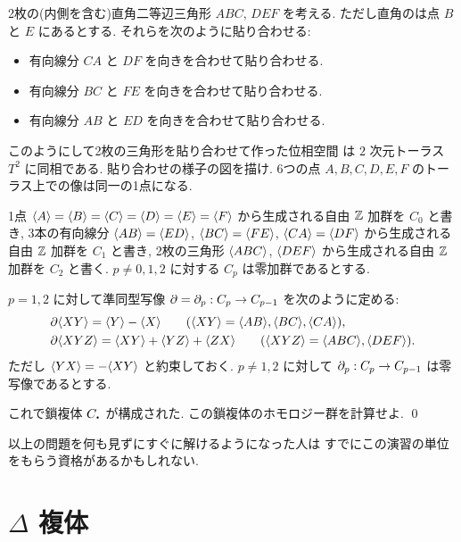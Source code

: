\documentclass[12pt,twoside]{jarticle}
\begin{document}
\begin{question}
\label{q:T^2-Delta}
  2枚の(内側を含む)直角二等辺三角形 $ABC$, $DEF$ を考える.
  ただし直角のは点 $B$ と $E$ にあるとする.
  それらを次のように貼り合わせる:
  \begin{itemize}
  \item 有向線分 $CA$ と $DF$ を向きを合わせて貼り合わせる. 
  \item 有向線分 $BC$ と $FE$ を向きを合わせて貼り合わせる. 
  \item 有向線分 $AB$ と $ED$ を向きを合わせて貼り合わせる. 
  \end{itemize}
  このようにして2枚の三角形を貼り合わせて作った位相空間
  は $2$ 次元トーラス $T^2$ に同相である.
  貼り合わせの様子の図を描け.
  6つの点 $A,B,C,D,E,F$ のトーラス上での像は同一の1点になる.

  1点 %
  $\langle A\rangle = \langle B\rangle = \langle C\rangle 
  = \langle D\rangle = \langle E\rangle = \langle F\rangle$
  から生成される自由 ${\mathbb Z}$ 加群を $C_0$ と書き, 
  3本の有向線分 %
  $\langle AB\rangle = \langle ED\rangle$, 
  $\langle BC\rangle = \langle FE\rangle$, 
  $\langle CA\rangle = \langle DF\rangle$ から生成される自由 ${\mathbb Z}$ 加群を $C_1$ と書き, 
  2枚の三角形 %
  $\langle ABC\rangle$, $\langle DEF\rangle$ から生成される自由 ${\mathbb Z}$ 加群を $C_2$ と書く.
  $p\ne 0,1,2$ に対する $C_p$ は零加群であるとする.

  $p=1,2$ に対して準同型写像 $\partial=\partial_p:C_p\to C_{p-1}$ を次のように定める:
  \begin{align*}
    &
    \partial\langle XY\rangle = \langle Y\rangle - \langle X\rangle
    \qquad (\langle XY\rangle = \langle AB\rangle, \langle BC\rangle, \langle CA\rangle),
    \\ &
    \partial\langle XYZ\rangle = \langle XY\rangle + \langle YZ\rangle + \langle ZX\rangle
    \qquad (\langle XYZ\rangle = \langle ABC\rangle, \langle DEF\rangle).
  \end{align*}
  ただし $\langle YX\rangle = -\langle XY\rangle$ と約束しておく.
  $p\ne 1,2$ に対して $\partial_p:C_p\to C_{p-1}$ は零写像であるとする.
 
  これで鎖複体 $C_\bcdot$ が構成された.
  この鎖複体のホモロジー群を計算せよ.
  \qed
\end{question}

以上の問題を何も見ずにすぐに解けるようになった人は
すでにこの演習の単位をもらう資格があるかもしれない.


\section{$\Delta$ 複体}
\label{sec:Delta-complex}
\end{document}
